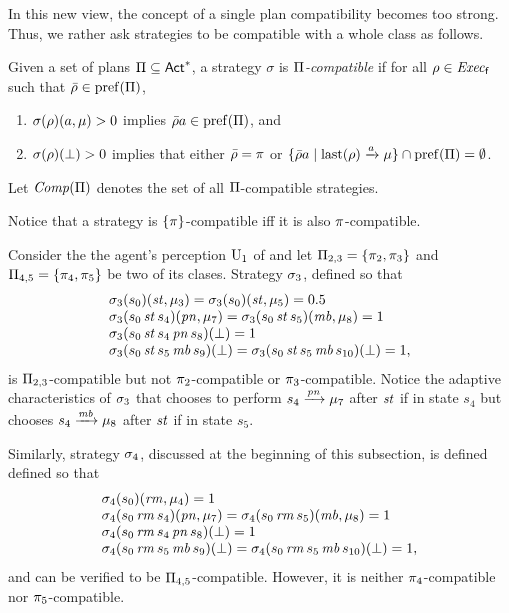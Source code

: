 In this new view, the concept of a single plan compatibility becomes
too strong.  Thus, we rather ask strategies to be compatible with a
whole class as follows.

\begin{definition}\label{def:plans:compat}
  Given a set of plans $\Pi\subseteq{\rm \sf Act}^*$, a strategy $\sigma$ is
  \emph{$\Pi$-compatible} if for all $\rho\in\mathit{Exec}_{\mathsf{f}}$ such that
  $\bar{\rho}\in\mathrm{pref}(\Pi)$,
  \begin{enumerate}
  \item%
    $\sigma(\rho)(a,\mu)>0$ implies $\bar{\rho}a\in\mathrm{pref}(\Pi)$, and
  \item%
    $\sigma(\rho)(\bot)>0$ implies that either
    $\bar{\rho}=\pi$ or
    $\{\bar{\rho}a\mid{\mathrm{last}(\rho)\xrightarrow{a}\mu}\}\cap\mathrm{pref}(\Pi) = \emptyset$. 
  \end{enumerate}
  Let $\mathit{Comp}(\Pi)$ denotes the set of all $\Pi$-compatible
  strategies.
\end{definition}
%
Notice that a strategy is $\{\pi\}$-compatible iff it is also
$\pi$-compatible.

\begin{example}\label{ex:running:strat-comp-adapt}
  Consider the the agent's perception $\operatorname{U}_1$ of
   and let $\Pi_{2,3}=\{\pi_2,\pi_3\}$
  and $\Pi_{4,5}=\{\pi_4,\pi_5\}$ be two of its clases.
  Strategy $\sigma_3$, defined so that
  \[
  \begin{array}{l}
    \sigma_3(s_0)(\mathit{st},\mu_3)=\sigma_3(s_0)(\mathit{st},\mu_5)=0.5\\
    \sigma_3(s_0\,\mathit{st}\,s_4)(\mathit{pn},\mu_7)=\sigma_3(s_0\,\mathit{st}\,s_5)(\mathit{mb},\mu_8)=1\\
    \sigma_3(s_0\,\mathit{st}\,s_4\,\mathit{pn}\,s_8)(\bot)=1\\
    \sigma_3(s_0\,\mathit{st}\,s_5\,\mathit{mb}\,s_9)(\bot)=
    \sigma_3(s_0\,\mathit{st}\,s_5\,\mathit{mb}\,s_{10})(\bot)=1,
  \end{array}
  \]
  is $\Pi_{2,3}$-compatible but not
  $\pi_2$-compatible or $\pi_3$-compatible.
  Notice the adaptive characteristics of $\sigma_3$ that chooses to
  perform $s_4\xrightarrow{\mathit{pn}}\mu_7$ after $\mathit{st}$ if in state $s_4$
  but chooses $s_4\xrightarrow{\mathit{mb}}\mu_8$ after $\mathit{st}$ if in
  state $s_5$.

  Similarly, strategy $\sigma_4$, discussed at the beginning of this
  subsection, is defined defined so that
  \[
  \begin{array}{l}
    \sigma_4(s_0)(\mathit{rm},\mu_4)=1\\
    \sigma_4(s_0\,\mathit{rm}\,s_4)(\mathit{pn},\mu_7)=\sigma_4(s_0\,\mathit{rm}\,s_5)(\mathit{mb},\mu_8)=1\\
    \sigma_4(s_0\,\mathit{rm}\,s_4\,\mathit{pn}\,s_8)(\bot)=1\\
    \sigma_4(s_0\,\mathit{rm}\,s_5\,\mathit{mb}\,s_9)(\bot)=
    \sigma_4(s_0\,\mathit{rm}\,s_5\,\mathit{mb}\,s_{10})(\bot)=1,
  \end{array}
  \]
  and can be verified to be $\Pi_{4,5}$-compatible. However, it is
  neither $\pi_4$-compatible nor $\pi_5$-compatible.
\end{example}

